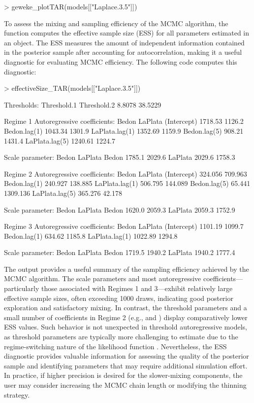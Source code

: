 \begin{example}
> geweke_plotTAR(models[["Laplace.3.5"]])
\end{example}

To assess the mixing and sampling efficiency of the MCMC algorithm, the  function computes the effective sample size (ESS) for all parameters estimated in an  object. The ESS measures the amount of independent information contained in the posterior sample after accounting for autocorrelation, making it a useful diagnostic for evaluating MCMC efficiency. The following code computes this diagnostic:

\begin{example}
> effectiveSize_TAR(models[["Laplace.3.5"]])

Thresholds:
Threshold.1 Threshold.2 
     8.8078     38.5229 

Regime 1
Autoregressive coefficients:
                 Bedon LaPlata
(Intercept)    1718.53  1126.2
Bedon.lag(1)   1043.34  1301.9
LaPlata.lag(1) 1352.69  1159.9
Bedon.lag(5)    908.21  1431.4
LaPlata.lag(5) 1240.61  1224.7

Scale parameter:
         Bedon LaPlata
Bedon   1785.1  2029.6
LaPlata 2029.6  1758.3

Regime 2
Autoregressive coefficients:
                 Bedon  LaPlata
(Intercept)    324.056  709.963
Bedon.lag(1)   240.927  138.885
LaPlata.lag(1) 506.795  144.089
Bedon.lag(5)    65.441 1309.136
LaPlata.lag(5) 365.276   42.178

Scale parameter:
         Bedon LaPlata
Bedon   1620.0  2059.3
LaPlata 2059.3  1752.9


Regime 3
Autoregressive coefficients:
                 Bedon LaPlata
(Intercept)    1101.19  1099.7
Bedon.lag(1)    634.62  1185.8
LaPlata.lag(1) 1022.89  1294.8

Scale parameter:
         Bedon LaPlata
Bedon   1719.5  1940.2
LaPlata 1940.2  1777.4
\end{example}

The output provides a useful summary of the sampling efficiency achieved by the MCMC algorithm. The scale parameters and most autoregressive coefficients—particularly those associated with Regimes 1 and 3—exhibit relatively large effective sample sizes, often exceeding 1000 draws, indicating good posterior exploration and satisfactory mixing. In contrast, the threshold parameters and a small number of coefficients in Regime 2 (e.g.,  and ) display comparatively lower ESS values. Such behavior is not unexpected in threshold autoregressive models, as threshold parameters are typically more challenging to estimate due to the regime-switching nature of the likelihood function \citep{VANEGAS2025}. Nevertheless, the ESS diagnostic provides valuable information for assessing the quality of the posterior sample and identifying parameters that may require additional simulation effort. In practice, if higher precision is desired for the slower-mixing components, the user may consider increasing the MCMC chain length or modifying the thinning strategy.

